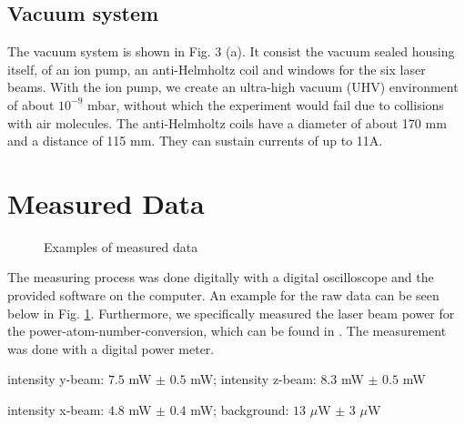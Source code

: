 \documentclass[12pt, a4paper]{article}
\begin{document}
\subsection{Vacuum system}
The vacuum system is shown in Fig. 3 (a). It consist the vacuum sealed housing itself, of an ion pump, an anti-Helmholtz coil and windows for the six laser beams. With the ion pump, we create an ultra-high vacuum (UHV) environment of about $10^{-9}$ mbar, without which the experiment would fail due to collisions with air molecules. The anti-Helmholtz coils have a diameter of about 170 mm and a distance of 115 mm. They can sustain currents of up to 11A.

\section{Measured Data}
\begin{figure}[h]
\centering
\caption{Examples of measured data}
	\label{examplemeas}
\end{figure}
The measuring process was done digitally with a digital oscilloscope and the provided software on the computer. An example for the raw data can be seen below in Fig. \ref{examplemeas}. Furthermore, we specifically measured the laser beam power for the power-atom-number-conversion, which can be found in \cite{script}. The measurement was done with a digital power meter.

intensity y-beam: $7.5$ mW $\pm$ $0.5$ mW; intensity z-beam: $8.3$ mW $\pm$ $0.5$ mW

intensity x-beam: $4.8$ mW $\pm$ $0.4$ mW; background: $13$ $\mu$W $\pm$ $3$ $\mu$W
\end{document}
